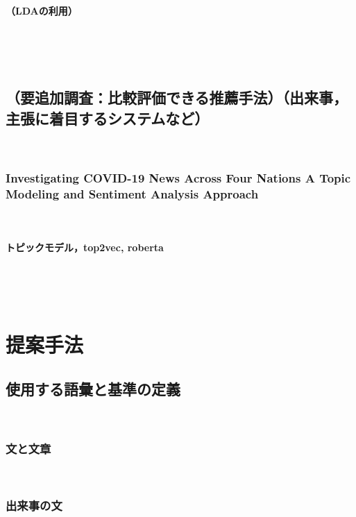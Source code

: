 \documentclass[12pt,a4j]{jreport}
\begin{document}
\subsubsection{（LDAの利用）}
~

~

\section{（要追加調査：比較評価できる推薦手法）（出来事，主張に着目するシステムなど）}
~

\subsection{Investigating COVID-19 News Across Four Nations A Topic Modeling and Sentiment Analysis Approach}
~

\subsubsection{トピックモデル，top2vec, roberta}
~

~%


\chapter{提案手法}


\section{使用する語彙と基準の定義}
~

\subsection{文と文章}
~

\subsection{出来事の文}
~
\end{document}
